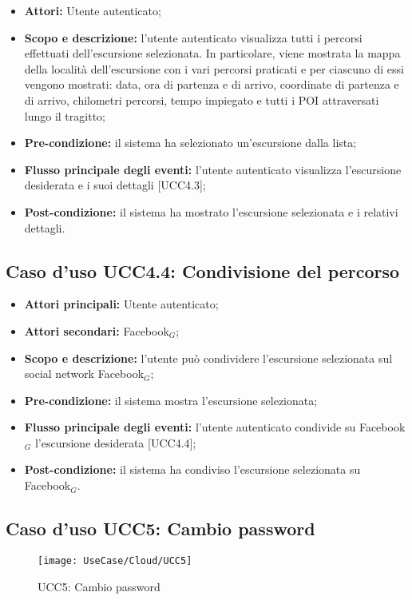 \begin{itemize}
\item \textbf{Attori:} Utente autenticato;
\item \textbf{Scopo e descrizione:} l'utente autenticato visualizza tutti i percorsi effettuati dell'escursione selezionata. In particolare, viene mostrata la mappa della località dell'escursione con i vari percorsi praticati e per ciascuno di essi vengono mostrati: data, ora di partenza e di arrivo, coordinate di partenza e di arrivo, chilometri percorsi, tempo impiegato e tutti i POI attraversati lungo il tragitto;
\item \textbf{Pre-condizione:} il sistema ha selezionato un'escursione dalla lista;
\item \textbf{Flusso principale degli eventi:} l'utente autenticato visualizza l'escursione desiderata e i suoi dettagli [UCC4.3];
\item \textbf{Post-condizione:} il sistema ha mostrato l'escursione selezionata e i relativi dettagli.
\end{itemize}

\subsection{Caso d'uso UCC4.4: Condivisione del percorso}

\begin{itemize}
\item \textbf{Attori principali:} Utente autenticato;
\item \textbf{Attori secondari:} Facebook$_{G}$;
\item \textbf{Scopo e descrizione:} l'utente può condividere l'escursione selezionata sul social network Facebook$_{G}$;
\item \textbf{Pre-condizione:} il sistema mostra l'escursione selezionata;
\item \textbf{Flusso principale degli eventi:} l'utente autenticato condivide su Facebook$_{G}$ l'escursione  desiderata [UCC4.4];
\item \textbf{Post-condizione:} il sistema ha condiviso l'escursione selezionata su Facebook$_{G}$. 
\end{itemize}

\subsection{Caso d'uso UCC5: Cambio password}

\begin{figure}[H]
\centering
\texttt{[image: UseCase/Cloud/UCC5]}
\caption{UCC5: Cambio password}
\end{figure}

